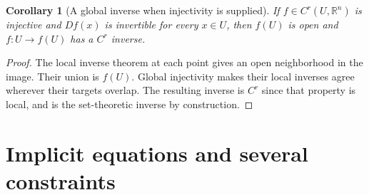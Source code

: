 \documentclass[11pt,oneside,openany]{book}
\newtheorem{corollary}[theorem]{Corollary}
\theoremstyle{definition}
\theoremstyle{remark}
\newcommand{\R}{\mathbb R}
\newcommand{\family}[1]{}
\begin{document}
\begin{corollary}[A global inverse when injectivity is supplied]\label{d04:04:injective-local-diffeomorphism}
If $f\in C^r(U,\R^n)$ is injective and $Df(x)$ is invertible for every
$x\in U$, then $f(U)$ is open and $f:U\to f(U)$ has a $C^r$ inverse.
\end{corollary}
\begin{proof}
The local inverse theorem at each point gives an open neighborhood in the
image. Their union is $f(U)$. Global injectivity makes their local inverses
agree wherever their targets overlap. The resulting inverse is $C^r$ since
that property is local, and is the set-theoretic inverse by construction.
\end{proof}

\section{Implicit equations and several constraints}
\family{K04.04.05}\family{K04.04.06}\family{K04.04.07}
\end{document}
